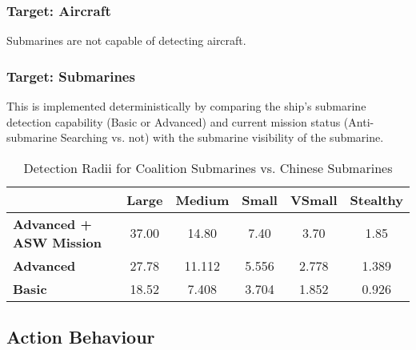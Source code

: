\documentclass{article}
\begin{document}
    \subsubsection{Target: Aircraft}
        Submarines are not capable of detecting aircraft. \\
        
    \subsubsection{Target: Submarines}
        This is implemented deterministically by comparing the ship's submarine detection capability (Basic or Advanced) and current mission status (Anti-submarine Searching vs. not) with the submarine visibility of the submarine. \\
 
        \begin{table}[h!]
            \centering
            \begin{tabular}{lccccc}
                \hline
                & \textbf{Large} & \textbf{Medium} & \textbf{Small} & \textbf{VSmall} & \textbf{Stealthy} \\
                \hline
                \textbf{Advanced + ASW Mission} & 37.00  & 14.80   & 7.40   & 3.70   & 1.85   \\
                \textbf{Advanced}               & 27.78  & 11.112  & 5.556  & 2.778  & 1.389  \\
                \textbf{Basic}                  & 18.52  & 7.408   & 3.704  & 1.852  & 0.926  \\
                \hline
            \end{tabular}
            \caption{Detection Radii for Coalition Submarines vs. Chinese Submarines}
            \label{CoalitionSubmarinesvs.CoalitionSubmarines}
        \end{table}
            
\subsection{Action Behaviour}
\end{document}
